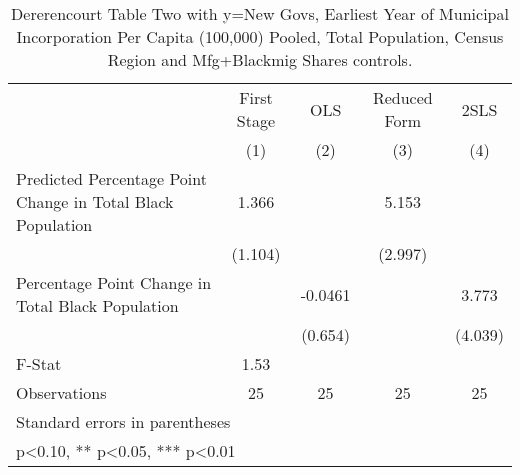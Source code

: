\begin{table}[htbp]\centering
\def\sym#1{\ifmmode^{#1}\else\(^{#1}\)\fi}
\caption{Dererencourt Table Two with y=New Govs, Earliest Year of Municipal Incorporation Per Capita (100,000) Pooled, Total Population, Census Region and Mfg+Blackmig Shares controls.}
\begin{tabular}{l*{4}{c}}
\toprule
                    & First Stage   &         OLS   &Reduced Form   &        2SLS   \\
                    &\multicolumn{1}{c}{(1)}   &\multicolumn{1}{c}{(2)}   &\multicolumn{1}{c}{(3)}   &\multicolumn{1}{c}{(4)}   \\
\midrule
Predicted Percentage Point Change in Total Black Population&       1.366   &               &       5.153   &               \\
                    &     (1.104)   &               &     (2.997)   &               \\
\addlinespace
Percentage Point Change in Total Black Population&               &     -0.0461   &               &       3.773   \\
                    &               &     (0.654)   &               &     (4.039)   \\
\midrule
F-Stat              &        1.53   &               &               &               \\
Observations        &          25   &          25   &          25   &          25   \\
\bottomrule
\multicolumn{5}{l}{\footnotesize Standard errors in parentheses}\\
\multicolumn{5}{l}{\footnotesize * p<0.10, ** p<0.05, *** p<0.01}\\
\end{tabular}
\end{table}
